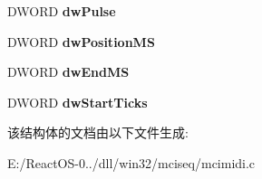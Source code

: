 \begin{DoxyCompactItemize}
\mbox{\label{structtag_w_i_n_e___m_c_i_m_i_d_i_a962671167ca81c31be45d1f742f117e1}} 
D\+W\+O\+RD {\bfseries dw\+Pulse}
\item 
\mbox{\label{structtag_w_i_n_e___m_c_i_m_i_d_i_a80fd66bee9b8bbd537b5e3fb7f287e1b}} 
D\+W\+O\+RD {\bfseries dw\+Position\+MS}
\item 
\mbox{\label{structtag_w_i_n_e___m_c_i_m_i_d_i_ab74bfc259ed674c36074c03d45855974}} 
D\+W\+O\+RD {\bfseries dw\+End\+MS}
\item 
\mbox{\label{structtag_w_i_n_e___m_c_i_m_i_d_i_a45b442b11f2f85ea7727138dc2b0f7e1}} 
D\+W\+O\+RD {\bfseries dw\+Start\+Ticks}
\end{DoxyCompactItemize}


该结构体的文档由以下文件生成\+:\begin{DoxyCompactItemize}
\item 
E\+:/\+React\+O\+S-\/0../dll/win32/mciseq/mcimidi.\+c\end{DoxyCompactItemize}

